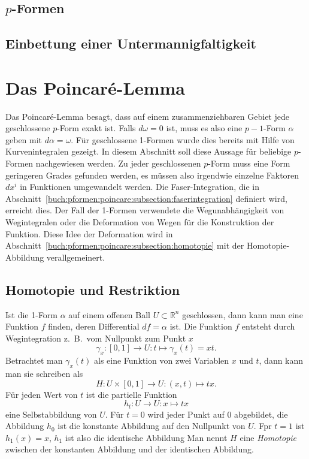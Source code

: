 \subsection{$p$-Formen}

\subsection{Einbettung einer Untermannigfaltigkeit}

%
%
\section{Das Poincaré-Lemma
\label{buch:pformen:section:poincarelemma}}
Das Poincaré-Lemma besagt, dass auf einem zusammenziehbaren Gebiet jede
geschlossene $p$-Form exakt ist.
Falls $d\omega=0$ ist, muss es also eine $p-1$-Form $\alpha$ geben mit
$d\alpha=\omega$.
Für geschlossene 1-Formen wurde dies bereits mit Hilfe von Kurvenintegralen
gezeigt.
In diesem Abschnitt soll diese Aussage für beliebige $p$-Formen
nachgewiesen werden.
Zu jeder geschlossenen $p$-Form muss eine Form geringeren Grades gefunden
werden, es müssen also irgendwie einzelne Faktoren $dx^i$ in Funktionen
umgewandelt werden.
Die Faser-Integration, die in
Abschnitt~\ref{buch:pformen:poincare:subsection:faserintegration}
definiert wird, erreicht dies.
Der Fall der 1-Formen verwendete die Wegunabhängigkeit von Wegintegralen
oder die Deformation von Wegen für die Konstruktion der Funktion.
Diese Idee der Deformation wird
in Abschnitt~\ref{buch:pformen:poincare:subsection:homotopie}
mit der Homotopie-Abbildung verallgemeinert.

%
%
\subsection{Homotopie und Restriktion}
%
Ist die 1-Form $\alpha$ auf einem offenen Ball $U\subset \mathbb{R}^n$
geschlossen, dann kann man eine Funktion $f$ finden, deren Differential
$df=\alpha$ ist.
Die Funktion $f$ entsteht durch Wegintegration z.~B.~vom Nullpunkt zum
Punkt $x$
\[
\gamma_x
\colon [0,1] \to U
:
t\mapsto \gamma_x(t) = xt.
\]
Betrachtet man $\gamma_x(t)$ als eine Funktion von zwei Variablen
$x$ und $t$, dann kann man sie schreiben als
\[
H
\colon
U\times[0,1]
\to
U
:
(x,t) \mapsto tx.
\]
Für jeden Wert von $t$ ist die partielle Funktion
\[
h_t \colon U \to U : x \mapsto tx
\]
eine Selbstabbildung von $U$.
Für $t=0$ wird jeder Punkt auf $0$ abgebildet, die Abbildung $h_0$ ist
die konstante Abbildung auf den Nullpunkt von $U$.
Fpr $t=1$ ist $h_1(x)=x$, $h_1$ ist also die identische Abbildung 
Man nennt $H$ eine {\em Homotopie} zwischen der konstanten Abbildung
und der identischen Abbildung.

